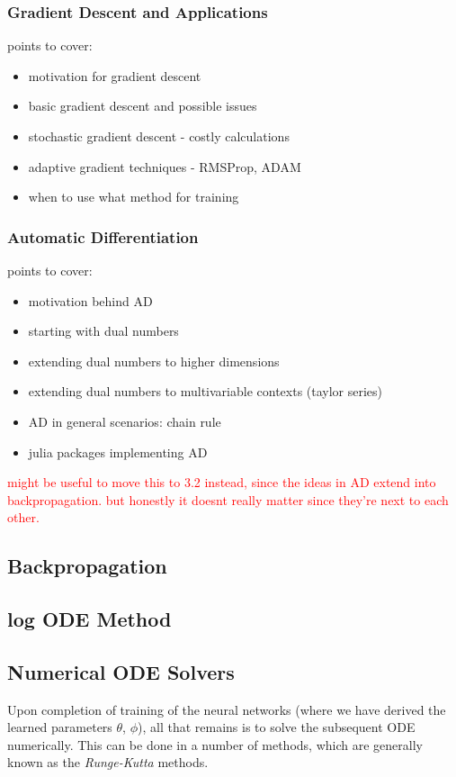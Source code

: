 \documentclass[a4paper,11pt, titlepage]{article}
\theoremstyle{definition}
\theoremstyle{plain}
\theoremstyle{remark}
\begin{document}
\subsubsection{Gradient Descent and Applications}
points to cover:
\begin{itemize}
    \item motivation for gradient descent
    \item basic gradient descent and possible issues
    \item stochastic gradient descent - costly calculations
    \item adaptive gradient techniques - RMSProp, ADAM
    \item when to use what method for training
\end{itemize}

\subsubsection{Automatic Differentiation}
points to cover:
\begin{itemize}
    \item motivation behind AD
    \item starting with dual numbers
    \item extending dual numbers to higher dimensions
    \item extending dual numbers to multivariable contexts (taylor series)
    \item AD in general scenarios: chain rule
    \item julia packages implementing AD
\end{itemize}
\textcolor{red}{might be useful to move this to 3.2 instead, since the ideas in AD extend into backpropagation. but honestly it doesnt really matter since they're next to each other.}

\subsection{Backpropagation}

\subsection{log ODE Method}

\subsection{Numerical ODE Solvers}
Upon completion of training of the neural networks (where we have derived the learned parameters $\theta$, $\phi$), all that remains is to solve the subsequent ODE numerically. This can be done in a number of methods, which are generally known as the \textit{Runge-Kutta} methods.
\end{document}
